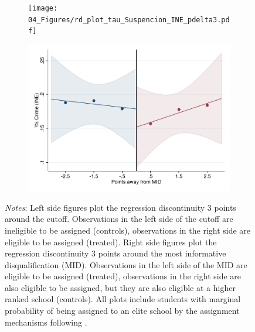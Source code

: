 \documentclass[oneside,11pt]{article}
\begin{document}
\begin{figure}[H]
\begin{center}
    \begin{subfigure}{0.475\textwidth}
        \centering
        \texttt{[image: 04\_Figures/rd\_plot\_tau\_Suspencion\_INE\_pdelta3.pdf]}
    \end{subfigure}
    \begin{subfigure}{0.475\textwidth}
        \centering
        \includegraphics[width=\textwidth]{04_Figures/rd_plot_mid_Suspencion_INE_pdelta3.pdf}
    \end{subfigure}
    \end{center}
    
\footnotesize
\textit{Notes}: Left side figures plot the regression discontinuity 3 points around the cutoff. Observations in the left side of the cutoff are ineligible to be assigned (controls), observations in the right side are eligible to be assigned (treated). Right side figures plot the regression discontinuity 3 points around the most informative disqualification (MID). Observations in the left side of the MID are eligible to be assigned (treated), observations in the right side are also eligible to be assigned, but they are also eligible at a higher ranked school (controls). All plots include students with marginal probability of being assigned to an elite school by the assignment mechanisms following \citet{abdulkadirouglu2022breaking}. 
\end{figure}


\clearpage

\end{document}
